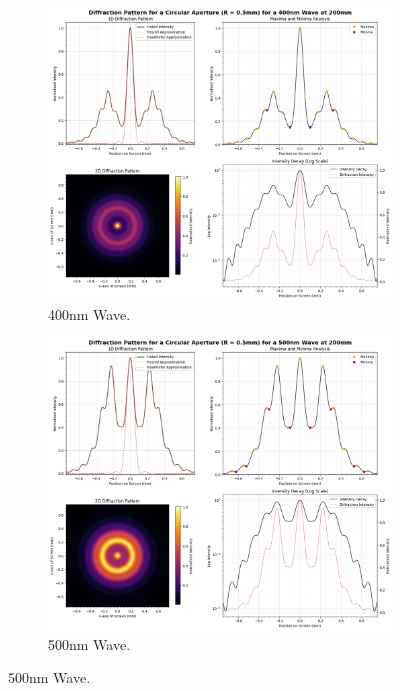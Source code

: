 \documentclass[12pt]{article}
\begin{document}
\begin{figure}[H]
    \centering
    \begin{subfigure}[b]{.48\textwidth}
        \centering
        \includegraphics[width=\linewidth]{circular_400nm.png}
        \caption{400nm Wave.}
        \label{fig:13a}
    \end{subfigure}
    \hspace{-.5em}
    \begin{subfigure}[b]{.48\textwidth}
        \centering
        \includegraphics[width=\linewidth]{circular_500nm.png}
        \caption{500nm Wave.}
        \label{fig:13b}
    \end{subfigure}
\end{figure}
\end{document}
